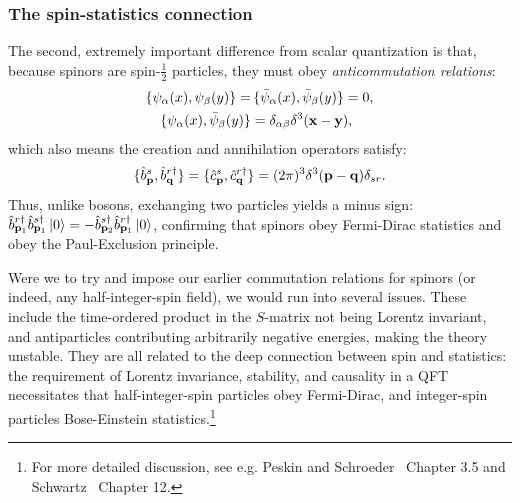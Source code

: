 
\subsubsection{The spin-statistics connection}

The second, extremely important difference from scalar quantization is that, because spinors are spin-$\frac{1}{2}$ particles, they must obey \textit{anticommutation relations}:
\begin{equation}
	\label{eq:01_qft_spinors_anticommutation}
	\begin{split}
		\{\psi_\alpha(x), \psi_\beta(y)\} =& \,\{\bar\psi_\alpha(x), \bar\psi_\beta(y)\} = 0, \\
		\{\psi_\alpha(x), \bar\psi_\beta(y)\} &= \delta_{\alpha\beta}\delta^3(\mathbf{x} - \mathbf{y}),
	\end{split}
\end{equation}
which also means the creation and annihilation operators satisfy:
\begin{equation}
	\label{eq:01_qft_spinors_anticommutation_operators}
	\{\hat b^{s}_{\mathbf{p}}, \hat b^{r\dagger}_{\mathbf{q}}\} = \{\hat c^{s}_{\mathbf{p}}, \hat c^{r\dagger}_{\mathbf{q}}\} = (2\pi)^3\delta^3(\mathbf{p} - \mathbf{q})\delta_{sr}.
\end{equation}
Thus, unlike bosons, exchanging two particles yields a minus sign: $\hat b^{r\dagger}_{\mathbf{p}_1} \hat b^{s\dagger}_{\mathbf{p}_1} \ket{0} = -\hat b^{s\dagger}_{\mathbf{p}_2} \hat b^{r\dagger}_{\mathbf{p}_1} \ket{0}$, confirming that spinors obey Fermi-Dirac statistics and obey the Paul-Exclusion principle.

Were we to try and impose our earlier commutation relations for spinors (or indeed, any half-integer-spin field), we would run into several issues.
These include the time-ordered product in the $S$-matrix not being Lorentz invariant, and antiparticles contributing arbitrarily negative energies, making the theory unstable.
They are all related to the deep connection between spin and statistics: the requirement of Lorentz invariance, stability, and causality in a QFT necessitates that half-integer-spin particles obey Fermi-Dirac, and integer-spin particles Bose-Einstein statistics.\footnote{For more detailed discussion, see e.g. Peskin and Schroeder~\cite{Peskin:1995ev} Chapter 3.5 and Schwartz~\cite{Schwartz:2014sze} Chapter 12.}


